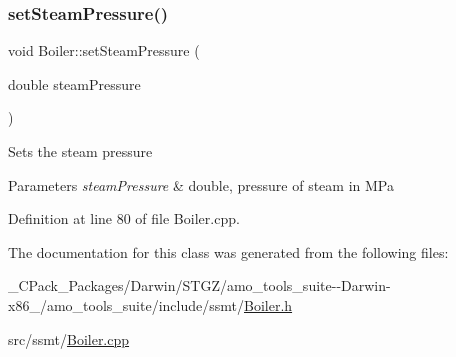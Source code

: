 \subsubsection{\texorpdfstring{set\+Steam\+Pressure()}{setSteamPressure()}\hspace{0.1cm}{\footnotesize\ttfamily [3/3]}}
{\footnotesize\ttfamily void Boiler\+::set\+Steam\+Pressure (\begin{DoxyParamCaption}\item[{double}]{steam\+Pressure }\end{DoxyParamCaption})}

Sets the steam pressure 
\begin{DoxyParams}{Parameters}
{\em steam\+Pressure} & double, pressure of steam in M\+Pa \\
\hline
\end{DoxyParams}


Definition at line 80 of file Boiler.\+cpp.



The documentation for this class was generated from the following files\+:\begin{DoxyCompactItemize}
\item 
\+\_\+\+C\+Pack\+\_\+\+Packages/\+Darwin/\+S\+T\+G\+Z/amo\+\_\+tools\+\_\+suite-\/-\/\+Darwin-\/x86\+\_/amo\+\_\+tools\+\_\+suite/include/ssmt/\hyperlink{___c_pack___packages_2_darwin_2_s_t_g_z_2amo__tools__suite--_darwin-x86__64_2amo__tools__suite_2include_2ssmt_2_boiler_8h}{Boiler.\+h}\item 
src/ssmt/\hyperlink{_boiler_8cpp}{Boiler.\+cpp}\end{DoxyCompactItemize}
